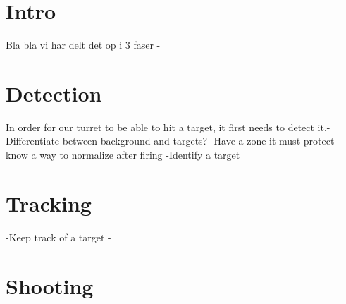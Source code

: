 \section{Intro}
Bla bla vi har delt det op i 3 faser - 
\section{Detection}
In order for our turret to be able to hit a target, it first needs to detect it.-Differentiate between background and targets?
-Have a zone it must protect
-know a way to normalize after firing
-Identify a target 
\section{Tracking}
-Keep track of a target
-
\section{Shooting}

